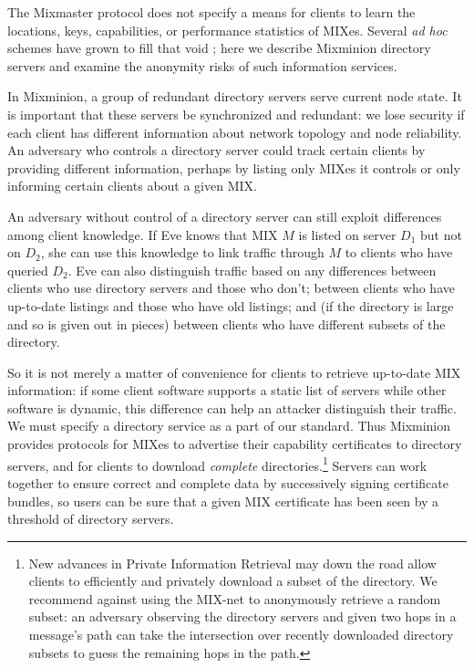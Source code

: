 \documentclass{llncs}
\begin{document}
The Mixmaster protocol does not specify a means for clients to learn the
locations, keys, capabilities, or performance statistics of MIXes. Several
\emph{ad hoc} schemes have grown to fill that void \cite{levien}; here
we describe Mixminion directory servers and examine the anonymity risks
of such information services.


In Mixminion, a group of redundant directory servers serve current
node state.  It is important that these servers be synchronized and
redundant:  we lose security if each client has different information
about network topology and node reliability. An adversary who controls
a directory server could track certain clients by providing different
information, perhaps by listing only MIXes it controls or only
informing certain clients about a given MIX.

An adversary without control of a directory server can still exploit
differences among client knowledge. If Eve knows that MIX $M$ is listed
on server $D_1$ but not on $D_2$, she can use this knowledge to link
traffic through $M$ to clients who have queried $D_2$.  Eve can also
distinguish traffic based on any differences between clients who use
directory servers and those who don't; between clients who have up-to-date
listings and those who have old listings; and (if the directory is large
and so is given out in pieces) between clients who have different subsets
of the directory.

So it is not merely a matter of convenience for clients to retrieve
up-to-date MIX information: if some client software supports a static
list of servers while other software is dynamic, this difference can
help an attacker distinguish their traffic. We must specify a directory
service as a part of our standard. Thus Mixminion provides protocols for
MIXes to advertise their capability certificates to directory servers,
and for clients to download \emph{complete} directories.\footnote{
  New advances in Private Information Retrieval \cite{malkin-thesis}
  may down the
  road allow clients to efficiently and privately download a subset of
  the directory. We recommend against using the MIX-net to anonymously
  retrieve a random subset: an adversary observing the directory servers
  and given two hops in a message's path can take the intersection over
  recently downloaded directory subsets to guess the remaining hops in
  the path.}
Servers can work together to ensure correct and complete data by
successively signing certificate bundles, so users can be sure that a
given MIX certificate has been seen by a threshold of directory servers.
\end{document}

